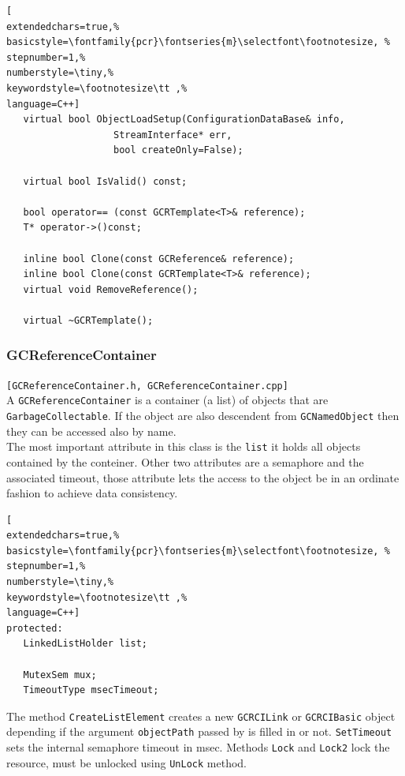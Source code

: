 \begin{lstlisting}[
extendedchars=true,%
basicstyle=\fontfamily{pcr}\fontseries{m}\selectfont\footnotesize, %
stepnumber=1,%
numberstyle=\tiny,%
keywordstyle=\footnotesize\tt ,%
language=C++]
   virtual bool ObjectLoadSetup(ConfigurationDataBase& info,
                   StreamInterface* err,
                   bool createOnly=False);

   virtual bool IsValid() const;

   bool operator== (const GCRTemplate<T>& reference);
   T* operator->()const;

   inline bool Clone(const GCReference& reference);
   inline bool Clone(const GCRTemplate<T>& reference);
   virtual void RemoveReference();

   virtual ~GCRTemplate();
\end{lstlisting}



\subsubsection{GCReferenceContainer}
\texttt{[GCReferenceContainer.h, GCReferenceContainer.cpp]}\\

A \texttt{GCReferenceContainer} is a container (a list) of objects that are \texttt{GarbageCollectable}. If the object are also descendent from \texttt{GCNamedObject} then they can be accessed also by name.\\


The most important attribute in this class is the \texttt{list} it holds all objects contained by the conteiner. Other two attributes are a semaphore and the associated timeout, those attribute lets the access to the object be in an ordinate fashion to achieve data consistency.
\begin{lstlisting}[
extendedchars=true,%
basicstyle=\fontfamily{pcr}\fontseries{m}\selectfont\footnotesize, %
stepnumber=1,%
numberstyle=\tiny,%
keywordstyle=\footnotesize\tt ,%
language=C++]
protected:
   LinkedListHolder list;

   MutexSem mux;
   TimeoutType msecTimeout;
\end{lstlisting}

The method \texttt{CreateListElement} creates a new \texttt{GCRCILink} or \texttt{GCRCIBasic} object depending if the argument \texttt{objectPath} passed by is filled in or not. \texttt{SetTimeout} sets the internal semaphore timeout in msec. Methods \texttt{Lock} and \texttt{Lock2} lock the resource, must be unlocked using \texttt{UnLock} method.

